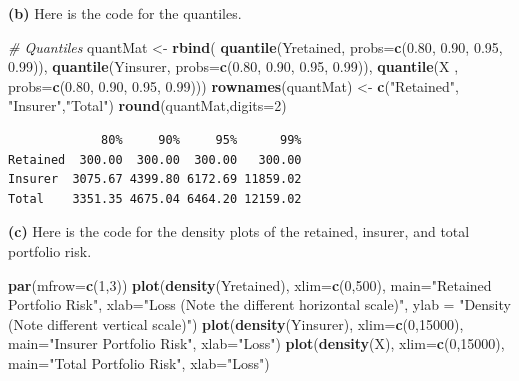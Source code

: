 \documentclass[]{book}
\newenvironment{Shaded}{\begin{snugshade}}{\end{snugshade}}
\newcommand{\KeywordTok}[1]{\textcolor[rgb]{0.13,0.29,0.53}{\textbf{#1}}}
\newcommand{\DataTypeTok}[1]{\textcolor[rgb]{0.13,0.29,0.53}{#1}}
\newcommand{\DecValTok}[1]{\textcolor[rgb]{0.00,0.00,0.81}{#1}}
\newcommand{\FloatTok}[1]{\textcolor[rgb]{0.00,0.00,0.81}{#1}}
\newcommand{\StringTok}[1]{\textcolor[rgb]{0.31,0.60,0.02}{#1}}
\newcommand{\CommentTok}[1]{\textcolor[rgb]{0.56,0.35,0.01}{\textit{#1}}}
\newcommand{\NormalTok}[1]{#1}
\theoremstyle{definition}
\theoremstyle{definition}
\theoremstyle{definition}
\theoremstyle{remark}
\begin{document}
\textbf{(b)} Here is the code for the quantiles.

\begin{Shaded}
\begin{Highlighting}[]
\CommentTok{# Quantiles}
\NormalTok{quantMat <-}\StringTok{ }\KeywordTok{rbind}\NormalTok{(}
  \KeywordTok{quantile}\NormalTok{(Yretained, }\DataTypeTok{probs=}\KeywordTok{c}\NormalTok{(}\FloatTok{0.80}\NormalTok{, }\FloatTok{0.90}\NormalTok{, }\FloatTok{0.95}\NormalTok{, }\FloatTok{0.99}\NormalTok{)),}
  \KeywordTok{quantile}\NormalTok{(Yinsurer,  }\DataTypeTok{probs=}\KeywordTok{c}\NormalTok{(}\FloatTok{0.80}\NormalTok{, }\FloatTok{0.90}\NormalTok{, }\FloatTok{0.95}\NormalTok{, }\FloatTok{0.99}\NormalTok{)),}
  \KeywordTok{quantile}\NormalTok{(X       ,  }\DataTypeTok{probs=}\KeywordTok{c}\NormalTok{(}\FloatTok{0.80}\NormalTok{, }\FloatTok{0.90}\NormalTok{, }\FloatTok{0.95}\NormalTok{, }\FloatTok{0.99}\NormalTok{)))}
\KeywordTok{rownames}\NormalTok{(quantMat) <-}\StringTok{ }\KeywordTok{c}\NormalTok{(}\StringTok{"Retained"}\NormalTok{, }\StringTok{"Insurer"}\NormalTok{,}\StringTok{"Total"}\NormalTok{)}
\KeywordTok{round}\NormalTok{(quantMat,}\DataTypeTok{digits=}\DecValTok{2}\NormalTok{)}
\end{Highlighting}
\end{Shaded}

\begin{verbatim}
             80%     90%     95%      99%
Retained  300.00  300.00  300.00   300.00
Insurer  3075.67 4399.80 6172.69 11859.02
Total    3351.35 4675.04 6464.20 12159.02
\end{verbatim}

\textbf{(c)} Here is the code for the density plots of the retained,
insurer, and total portfolio risk.

\begin{Shaded}
\begin{Highlighting}[]
\KeywordTok{par}\NormalTok{(}\DataTypeTok{mfrow=}\KeywordTok{c}\NormalTok{(}\DecValTok{1}\NormalTok{,}\DecValTok{3}\NormalTok{))}
\KeywordTok{plot}\NormalTok{(}\KeywordTok{density}\NormalTok{(Yretained), }\DataTypeTok{xlim=}\KeywordTok{c}\NormalTok{(}\DecValTok{0}\NormalTok{,}\DecValTok{500}\NormalTok{), }\DataTypeTok{main=}\StringTok{"Retained Portfolio Risk"}\NormalTok{, }\DataTypeTok{xlab=}\StringTok{"Loss (Note the different horizontal scale)"}\NormalTok{, }\DataTypeTok{ylab =} \StringTok{"Density (Note different vertical scale)"}\NormalTok{)}
\KeywordTok{plot}\NormalTok{(}\KeywordTok{density}\NormalTok{(Yinsurer), }\DataTypeTok{xlim=}\KeywordTok{c}\NormalTok{(}\DecValTok{0}\NormalTok{,}\DecValTok{15000}\NormalTok{), }\DataTypeTok{main=}\StringTok{"Insurer Portfolio Risk"}\NormalTok{, }\DataTypeTok{xlab=}\StringTok{"Loss"}\NormalTok{)}
\KeywordTok{plot}\NormalTok{(}\KeywordTok{density}\NormalTok{(X), }\DataTypeTok{xlim=}\KeywordTok{c}\NormalTok{(}\DecValTok{0}\NormalTok{,}\DecValTok{15000}\NormalTok{), }\DataTypeTok{main=}\StringTok{"Total Portfolio Risk"}\NormalTok{, }\DataTypeTok{xlab=}\StringTok{"Loss"}\NormalTok{)}
\end{Highlighting}
\end{Shaded}
\end{document}

